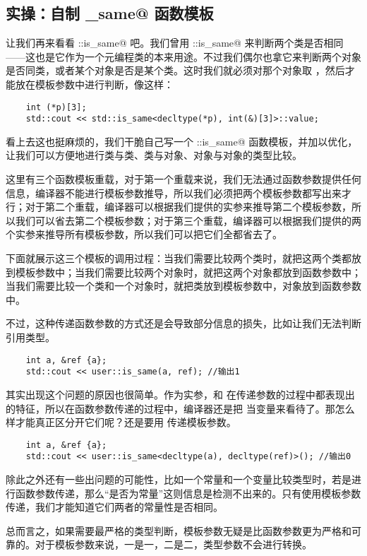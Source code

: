 \subsection*{实操：自制 \lstinline@is_same@ 函数模板}
让我们再来看看 \lstinline@std::is_same@ 吧。我们曾用 \lstinline@std::is_same@ 来判断两个类是否相同——这也是它作为一个元编程类的本来用途。不过我们偶尔也拿它来判断两个对象是否同类，或者某个对象是否是某个类。这时我们就必须对那个对象取 \lstinline@decltype@，然后才能放在模板参数中进行判断，像这样：
\begin{lstlisting}
    int (*p)[3];
    std::cout << std::is_same<decltype(*p), int(&)[3]>::value;
\end{lstlisting}\par
看上去这也挺麻烦的，我们干脆自己写一个 \lstinline@user::is_same@ 函数模板，并加以优化，让我们可以方便地进行类与类、类与对象、对象与对象的类型比较。

这里有三个函数模板重载，对于第一个重载来说，我们无法通过函数参数提供任何信息，编译器不能进行模板参数推导，所以我们必须把两个模板参数都写出来才行；对于第二个重载，编译器可以根据我们提供的实参来推导第二个模板参数，所以我们可以省去第二个模板参数；对于第三个重载，编译器可以根据我们提供的两个实参来推导所有模板参数，所以我们可以把它们全都省去了。\par
下面就展示这三个模板的调用过程：当我们需要比较两个类时，就把这两个类都放到模板参数中；当我们需要比较两个对象时，就把这两个对象都放到函数参数中；当我们需要比较一个类和一个对象时，就把类放到模板参数中，对象放到函数参数中。\par

不过，这种传递函数参数的方式还是会导致部分信息的损失，比如让我们无法判断引用类型。
\begin{lstlisting}
    int a, &ref {a};
    std::cout << user::is_same(a, ref); //输出1
\end{lstlisting}\par
其实出现这个问题的原因也很简单。作为实参，\lstinline@a@ 和 \lstinline@ref@ 在传递参数的过程中都表现出 \lstinline@int@ 的特征，所以在函数参数传递的过程中，编译器还是把 \lstinline@ref@ 当变量来看待了。那怎么样才能真正区分开它们呢？还是要用 \lstinline@decltype@ 传递模板参数。
\begin{lstlisting}
    int a, &ref {a};
    std::cout << user::is_same<decltype(a), decltype(ref)>(); //输出0
\end{lstlisting}\par
除此之外还有一些出问题的可能性，比如一个常量和一个变量比较类型时，若是进行函数参数传递，那么``是否为常量''这则信息是检测不出来的。只有使用模板参数传递，我们才能知道它们两者的常量性是否相同。\par
总而言之，如果需要最严格的类型判断，模板参数无疑是比函数参数更为严格和可靠的。对于模板参数来说，一是一，二是二，类型参数不会进行转换。\par
